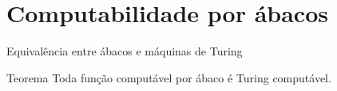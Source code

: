 \section{Computabilidade por ábacos}

\begin{frame}[fragile]{Equivalência entre ábacos e máquinas de Turing}

    \begin{block}{Teorema}
        Toda função computável por ábaco é Turing computável.
    \end{block}

\end{frame}
